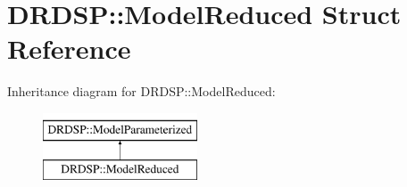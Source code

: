 \hypertarget{struct_d_r_d_s_p_1_1_model_reduced}{\section{D\-R\-D\-S\-P\-:\-:Model\-Reduced Struct Reference}
\label{struct_d_r_d_s_p_1_1_model_reduced}
}
Inheritance diagram for D\-R\-D\-S\-P\-:\-:Model\-Reduced\-:\begin{figure}[H]
\begin{center}
\leavevmode
\includegraphics[height=2.000000cm]{struct_d_r_d_s_p_1_1_model_reduced}
\end{center}
\end{figure}
